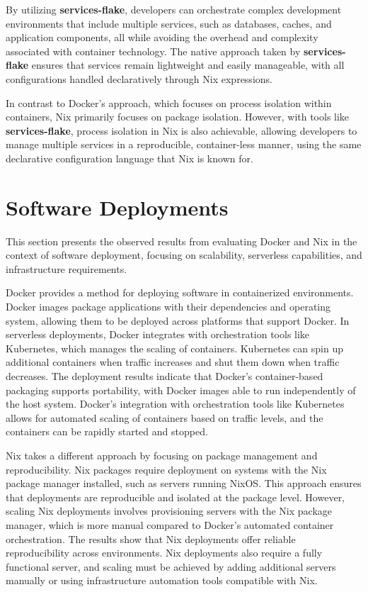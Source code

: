 By utilizing \textbf{services-flake}, developers can orchestrate complex development
environments that include multiple services, such as databases, caches, and application
components, all while avoiding the overhead and complexity associated with container
technology. The native approach taken by \textbf{services-flake} ensures that services
remain lightweight and easily manageable, with all configurations handled declaratively
through Nix expressions.

In contrast to Docker’s approach, which focuses on process isolation within containers,
Nix primarily focuses on package isolation. However, with tools like \textbf{services-flake},
process isolation in Nix is also achievable, allowing developers to manage multiple services
in a reproducible, container-less manner, using the same declarative configuration language
that Nix is known for.

\section{Software Deployments}
This section presents the observed results from evaluating Docker and Nix in the context of
software deployment, focusing on scalability, serverless capabilities, and infrastructure
requirements.

Docker provides a method for deploying software in containerized environments. Docker images
package applications with their dependencies and operating system, allowing them to be
deployed across platforms that support Docker. In serverless deployments, Docker integrates
with orchestration tools like Kubernetes, which manages the scaling of containers. Kubernetes
can spin up additional containers when traffic increases and shut them down when traffic
decreases. The deployment results indicate that Docker's container-based packaging supports
portability, with Docker images able to run independently of the host system. Docker's
integration with orchestration tools like Kubernetes allows for automated scaling of
containers based on traffic levels, and the containers can be rapidly started and stopped.

Nix takes a different approach by focusing on package management and reproducibility.
Nix packages require deployment on systems with the Nix package manager installed, such
as servers running NixOS. This approach ensures that deployments are reproducible and
isolated at the package level. However, scaling Nix deployments involves provisioning
servers with the Nix package manager, which is more manual compared to Docker's automated
container orchestration. The results show that Nix deployments offer reliable reproducibility
across environments. Nix deployments also require a fully functional server, and scaling
must be achieved by adding additional servers manually or using infrastructure automation
tools compatible with Nix.

